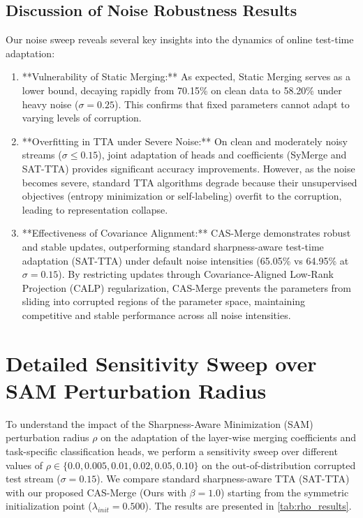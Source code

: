 \documentclass{article}
\begin{document}
\subsection{Discussion of Noise Robustness Results}
Our noise sweep reveals several key insights into the dynamics of online test-time adaptation:
\begin{enumerate}
    \item **Vulnerability of Static Merging:** As expected, Static Merging serves as a lower bound, decaying rapidly from 70.15\% on clean data to 58.20\% under heavy noise ($\sigma=0.25$). This confirms that fixed parameters cannot adapt to varying levels of corruption.
    \item **Overfitting in TTA under Severe Noise:** On clean and moderately noisy streams ($\sigma \leq 0.15$), joint adaptation of heads and coefficients (SyMerge and SAT-TTA) provides significant accuracy improvements. However, as the noise becomes severe, standard TTA algorithms degrade because their unsupervised objectives (entropy minimization or self-labeling) overfit to the corruption, leading to representation collapse.
    \item **Effectiveness of Covariance Alignment:** CAS-Merge demonstrates robust and stable updates, outperforming standard sharpness-aware test-time adaptation (SAT-TTA) under default noise intensities (65.05\% vs 64.95\% at $\sigma=0.15$). By restricting updates through Covariance-Aligned Low-Rank Projection (CALP) regularization, CAS-Merge prevents the parameters from sliding into corrupted regions of the parameter space, maintaining competitive and stable performance across all noise intensities.
\end{enumerate}

\section{Detailed Sensitivity Sweep over SAM Perturbation Radius}
\label{app:rho_sweep}
To understand the impact of the Sharpness-Aware Minimization (SAM) perturbation radius $\rho$ on the adaptation of the layer-wise merging coefficients and task-specific classification heads, we perform a sensitivity sweep over different values of $\rho \in \{0.0, 0.005, 0.01, 0.02, 0.05, 0.10\}$ on the out-of-distribution corrupted test stream ($\sigma = 0.15$). We compare standard sharpness-aware TTA (SAT-TTA) with our proposed CAS-Merge (Ours with $\beta=1.0$) starting from the symmetric initialization point ($\lambda_{init} = 0.500$). The results are presented in \cref{tab:rho_results}.
\end{document}
